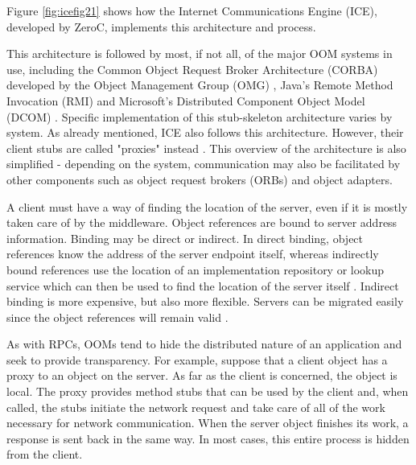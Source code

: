 \documentclass{acm_proc_article-sp}
\begin{document}
Figure \ref{fig:icefig21} shows how the Internet Communications Engine (ICE), developed by ZeroC, implements this architecture and process.



This architecture is followed by most, if not all, of the major OOM systems in use, including the Common Object Request Broker Architecture (CORBA) developed by the Object Management Group (OMG) \cite{Emmerich:2007p8368}, Java's Remote Method Invocation (RMI) \cite{Vinoski:2004p8371} and Microsoft's Distributed Component Object Model (DCOM) \cite{Pinus:2006p8367}.  Specific implementation of this stub-skeleton architecture varies by system.  As already mentioned, ICE also follows this architecture.  However, their client stubs are called "proxies" instead \cite{icemanual}.  This overview of the architecture is also simplified - depending on the system, communication may also be facilitated by other components such as object request brokers (ORBs) and object adapters.

A client must have a way of finding the location of the server, even if it is mostly taken care of by the middleware.  Object references are bound to server address information.  Binding may be direct or indirect.  In direct binding, object references know the address of the server endpoint itself, whereas indirectly bound references use the location of an implementation repository or lookup service which can then be used to find the location of the server itself \cite{Henning:2004p8372}.  Indirect binding is more expensive, but also more flexible.  Servers can be migrated easily since the object references will remain valid \cite{icemanual}.

As with RPCs, OOMs tend to hide the distributed nature of an application and seek to provide transparency.  For example, suppose that a client object has a proxy to an object on the server.  As far as the client is concerned, the object is local.  The proxy provides method stubs that can be used by the client and, when called, the stubs initiate the network request and take care of all of the work necessary for network communication.  When the server object finishes its work, a response is sent back in the same way.  In most cases, this entire process is hidden from the client.
\end{document}
